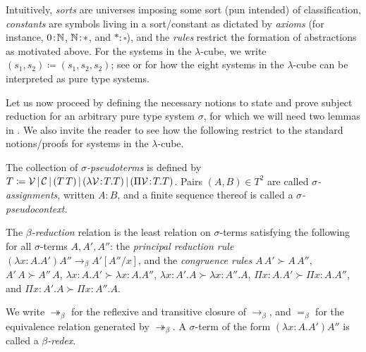 \documentclass[reqno, twoside]{article}
\begin{document}
    Intuitively, \textit{sorts} are universes imposing some sort (pun intended) of classification, \textit{constants} are symbols living in a sort/constant as dictated by \textit{axioms} (for instance, $0\!:\!\mathbb{N}$, $\mathbb{N}\!:\!\ast$, and $\ast\!:\!\square$), and the \textit{rules} restrict the formation of abstractions as motivated above. For the systems in the $\lambda$-cube, we write $(s_1,s_2)\coloneqq(s_1,s_2,s_2)$; see \cite{Bar91} or \cite{Bar92} for how the eight systems in the $\lambda$-cube can be interpreted as pure type systems.

    Let us now proceed by defining the necessary notions to state and prove subject reduction for an arbitrary pure type system $\sigma$, for which we will need two lemmas in \cite{GN91}. We also invite the reader to see how the following restrict to the standard notions/proofs for systems in the $\lambda$-cube.

    \begin{definition}
        The collection of \textit{$\sigma$-pseudoterms} is defined by $T\coloneqq\mathcal{V}\,|\,\mathcal{C}\,|\,(T\,T)\,|\,(\lambda\mathcal{V}\!:\!T.T)\,|\,(\Pi\mathcal{V}\!:\!T.T)$. Pairs $(A,B)\in T^2$ are called \textit{$\sigma$-assignments}, written $A\!:\!B$, and a finite sequence thereof is called a \textit{$\sigma$-pseudocontext}.
    \end{definition}

    \begin{definition}
        The \textit{$\beta$-reduction} relation is the least relation on $\sigma$-terms satisfying the following for all $\sigma$-terms $A,A',A''$: the \textit{principal reduction rule} $(\lambda x\!:\!A.A')A''\rightarrow_\beta A'[A''/x]$, and the \textit{congruence rules} $A\,A'\succ A\,A''$, $A'\,A\succ A''\,A$, $\lambda x\!:\!A.A'\succ\lambda x\!:\!A.A''$, $\lambda x\!:\!A'.A\succ\lambda x\!:\!A''.A$, $\Pi x\!:\!A.A'\succ\Pi x\!:\!A.A''$, and $\Pi x\!:\!A'.A\succ\Pi x\!:\!A''.A$.
    \end{definition}

    \begin{notation}
        We write $\twoheadrightarrow_\beta$ for the reflexive and transitive closure of $\rightarrow_\beta$, and $=_\beta$ for the equivalence relation generated by $\twoheadrightarrow_\beta$. A $\sigma$-term of the form $(\lambda x\!:\!A.A')A''$ is called a \textit{$\beta$-redex}.
    \end{notation}
\end{document}
